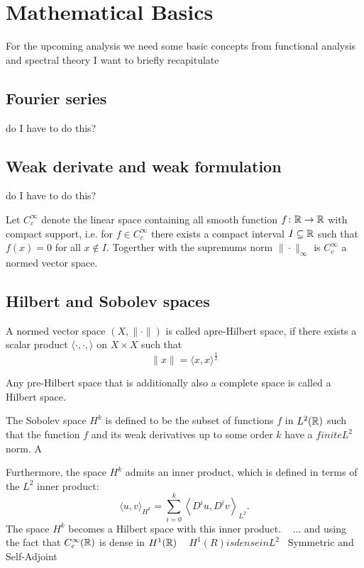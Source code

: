 \section*{Mathematical Basics}

For the upcoming analysis we need some basic concepts from functional analysis and spectral theory I want to briefly recapitulate

\subsection*{Fourier series} do I have to do this?

\subsection*{Weak derivate and weak formulation} do I have to do this?

Let $C_{c}^{\infty}$ denote the linear space containing all smooth function $f \colon \mathbb{R} \rightarrow \mathbb{R}$ with compact support, i.e. for $f \in C_{c}^{\infty}$ there exists a compact interval $I \subseteq \mathbb{R}$ such that $f(x) = 0$ for all $x \notin I$. Togerther with the supremums norm $\| \cdot \|_{\infty}$ is $C_{c}^{\infty}$ a normed vector space.

\subsection*{Hilbert and Sobolev spaces}
A normed vector space $(X, \| \cdot \|)$ is called apre-Hilbert space, if there exists a scalar product $\langle \cdot, \cdot, \rangle$ on $X \times X$ such that
	\[ \| x \| = \langle x, x \rangle^{\frac{1}{2}} \] 

Any pre-Hilbert space that is additionally also a complete space is called a Hilbert space.

The Sobolev space $H^{k}$ is defined to be the subset of functions $f$ in $L^{2}(\mathbb{R})$ such that the function $f$ and its weak derivatives up to some order $k$ have a $finite L^{2}$ norm. A

Furthermore, the space $H^{k}$ admits an inner product, which is defined in terms of the $L^2$ inner product: 
	\[ \langle u , v \rangle_{H^{k}} = \sum_{i=0}^{k} \left\langle D^{i}u , D^{i} v \right\rangle_{L^{2}}. \] 
The space $H^{k}$ becomes a Hilbert space with this inner product.
~\newline
... and using the fact that $C_{c}^{\infty}(\mathbb{R})$ is dense in $H^{1}(\mathbb{R})$
~\newline
$H^1(R) is dense in L^2$
~\newline Symmetric and Self-Adjoint
